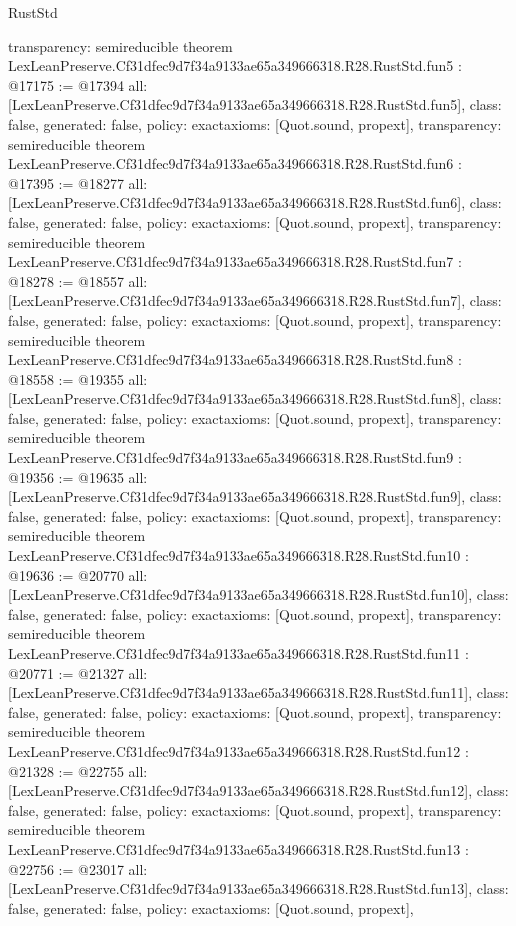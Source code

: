 \begin{lexlean}{RustStd}
\begin{coremodule}
{  transparency: semireducible
}
theorem LexLeanPreserve.Cf31dfec9d7f34a9133ae65a349666318.R28.RustStd.fun5 : @17175 := @17394 {
  all: [LexLeanPreserve.Cf31dfec9d7f34a9133ae65a349666318.R28.RustStd.fun5],
  class: false,
  generated: false,
  policy: exact{axioms: [Quot.sound, propext]},
  transparency: semireducible
}
theorem LexLeanPreserve.Cf31dfec9d7f34a9133ae65a349666318.R28.RustStd.fun6 : @17395 := @18277 {
  all: [LexLeanPreserve.Cf31dfec9d7f34a9133ae65a349666318.R28.RustStd.fun6],
  class: false,
  generated: false,
  policy: exact{axioms: [Quot.sound, propext]},
  transparency: semireducible
}
theorem LexLeanPreserve.Cf31dfec9d7f34a9133ae65a349666318.R28.RustStd.fun7 : @18278 := @18557 {
  all: [LexLeanPreserve.Cf31dfec9d7f34a9133ae65a349666318.R28.RustStd.fun7],
  class: false,
  generated: false,
  policy: exact{axioms: [Quot.sound, propext]},
  transparency: semireducible
}
theorem LexLeanPreserve.Cf31dfec9d7f34a9133ae65a349666318.R28.RustStd.fun8 : @18558 := @19355 {
  all: [LexLeanPreserve.Cf31dfec9d7f34a9133ae65a349666318.R28.RustStd.fun8],
  class: false,
  generated: false,
  policy: exact{axioms: [Quot.sound, propext]},
  transparency: semireducible
}
theorem LexLeanPreserve.Cf31dfec9d7f34a9133ae65a349666318.R28.RustStd.fun9 : @19356 := @19635 {
  all: [LexLeanPreserve.Cf31dfec9d7f34a9133ae65a349666318.R28.RustStd.fun9],
  class: false,
  generated: false,
  policy: exact{axioms: [Quot.sound, propext]},
  transparency: semireducible
}
theorem LexLeanPreserve.Cf31dfec9d7f34a9133ae65a349666318.R28.RustStd.fun10 : @19636 := @20770 {
  all: [LexLeanPreserve.Cf31dfec9d7f34a9133ae65a349666318.R28.RustStd.fun10],
  class: false,
  generated: false,
  policy: exact{axioms: [Quot.sound, propext]},
  transparency: semireducible
}
theorem LexLeanPreserve.Cf31dfec9d7f34a9133ae65a349666318.R28.RustStd.fun11 : @20771 := @21327 {
  all: [LexLeanPreserve.Cf31dfec9d7f34a9133ae65a349666318.R28.RustStd.fun11],
  class: false,
  generated: false,
  policy: exact{axioms: [Quot.sound, propext]},
  transparency: semireducible
}
theorem LexLeanPreserve.Cf31dfec9d7f34a9133ae65a349666318.R28.RustStd.fun12 : @21328 := @22755 {
  all: [LexLeanPreserve.Cf31dfec9d7f34a9133ae65a349666318.R28.RustStd.fun12],
  class: false,
  generated: false,
  policy: exact{axioms: [Quot.sound, propext]},
  transparency: semireducible
}
theorem LexLeanPreserve.Cf31dfec9d7f34a9133ae65a349666318.R28.RustStd.fun13 : @22756 := @23017 {
  all: [LexLeanPreserve.Cf31dfec9d7f34a9133ae65a349666318.R28.RustStd.fun13],
  class: false,
  generated: false,
  policy: exact{axioms: [Quot.sound, propext]},
}
\end{coremodule}
\end{lexlean}
